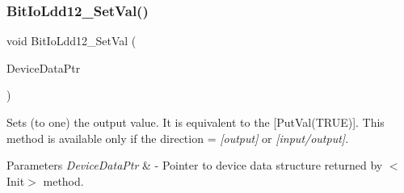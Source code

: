\subsubsection{\texorpdfstring{Bit\+Io\+Ldd12\+\_\+\+Set\+Val()}{BitIoLdd12\_SetVal()}}
{\footnotesize\ttfamily void Bit\+Io\+Ldd12\+\_\+\+Set\+Val (\begin{DoxyParamCaption}\item[{\hyperlink{group___p_e___types__module_gac5cf1362f1f0e3a2ce71b1bf2276d091}{L\+D\+D\+\_\+\+T\+Device\+Data} $\ast$}]{Device\+Data\+Ptr }\end{DoxyParamCaption})}



Sets (to one) the output value. It is equivalent to the \mbox{[}Put\+Val(\+T\+R\+U\+E)\mbox{]}. This method is available only if the direction = {\itshape \mbox{[}output\mbox{]}} or {\itshape \mbox{[}input/output\mbox{]}}. 


\begin{DoxyParams}{Parameters}
{\em Device\+Data\+Ptr} & -\/ Pointer to device data structure returned by $<$\+Init$>$ method. \\
\hline
\end{DoxyParams}
